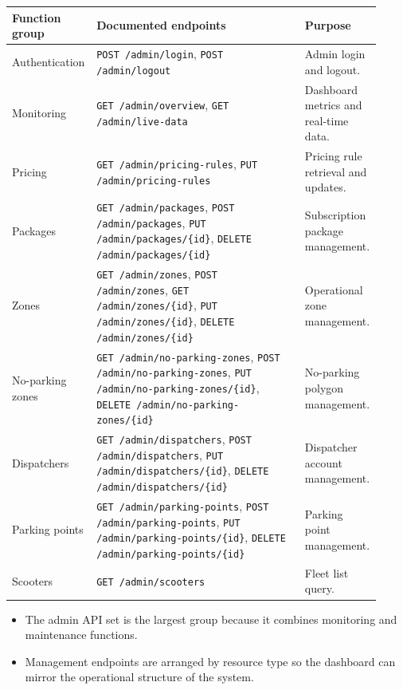 \documentclass[12pt,a4paper]{article}
\begin{document}
\begin{longtable}{p{0.22\linewidth} p{0.56\linewidth} p{0.14\linewidth}}
\toprule
\textbf{Function group} & \textbf{Documented endpoints} & \textbf{Purpose} \\
\midrule
\endhead
Authentication & \texttt{POST /admin/login}, \texttt{POST /admin/logout} & Admin login and logout. \\
Monitoring & \texttt{GET /admin/overview}, \texttt{GET /admin/live-data} & Dashboard metrics and real-time data. \\
Pricing & \texttt{GET /admin/pricing-rules}, \texttt{PUT /admin/pricing-rules} & Pricing rule retrieval and updates. \\
Packages & \texttt{GET /admin/packages}, \texttt{POST /admin/packages}, \texttt{PUT /admin/packages/\{id\}}, \texttt{DELETE /admin/packages/\{id\}} & Subscription package management. \\
Zones & \texttt{GET /admin/zones}, \texttt{POST /admin/zones}, \texttt{GET /admin/zones/\{id\}}, \texttt{PUT /admin/zones/\{id\}}, \texttt{DELETE /admin/zones/\{id\}} & Operational zone management. \\
No-parking zones & \texttt{GET /admin/no-parking-zones}, \texttt{POST /admin/no-parking-zones}, \texttt{PUT /admin/no-parking-zones/\{id\}}, \texttt{DELETE /admin/no-parking-zones/\{id\}} & No-parking polygon management. \\
Dispatchers & \texttt{GET /admin/dispatchers}, \texttt{POST /admin/dispatchers}, \texttt{PUT /admin/dispatchers/\{id\}}, \texttt{DELETE /admin/dispatchers/\{id\}} & Dispatcher account management. \\
Parking points & \texttt{GET /admin/parking-points}, \texttt{POST /admin/parking-points}, \texttt{PUT /admin/parking-points/\{id\}}, \texttt{DELETE /admin/parking-points/\{id\}} & Parking point management. \\
Scooters & \texttt{GET /admin/scooters} & Fleet list query. \\
\bottomrule
\end{longtable}

\begin{itemize}
  \item The admin API set is the largest group because it combines monitoring and maintenance functions.
  \item Management endpoints are arranged by resource type so the dashboard can mirror the operational structure of the system.
\end{itemize}
\end{document}
